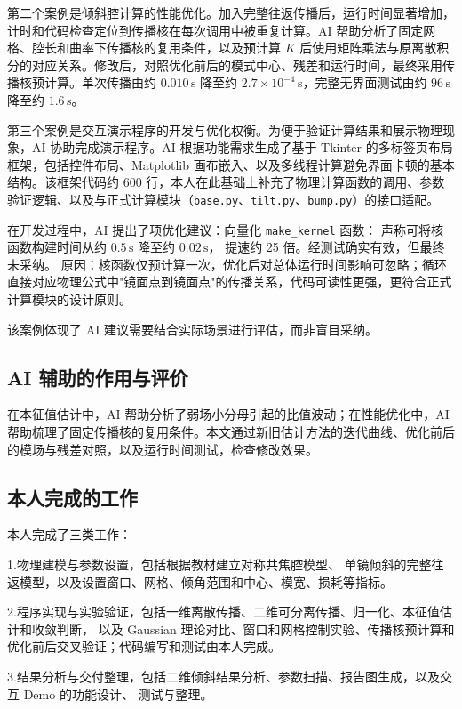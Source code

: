 \documentclass[UTF8,a4paper,12pt]{ctexart}
\begin{document}
第二个案例是倾斜腔计算的性能优化。加入完整往返传播后，运行时间显著增加，计时和代码检查定位到传播核在每次调用中被重复计算。AI 帮助分析了固定网格、腔长和曲率下传播核的复用条件，以及预计算 \(K\) 后使用矩阵乘法与原离散积分的对应关系。修改后，对照优化前后的模式中心、残差和运行时间，最终采用传播核预计算。单次传播由约 \(0.010\,\mathrm{s}\) 降至约 \(2.7\times10^{-4}\,\mathrm{s}\)，完整无界面测试由约 \(96\,\mathrm{s}\) 降至约 \(1.6\,\mathrm{s}\)。

第三个案例是交互演示程序的开发与优化权衡。为便于验证计算结果和展示物理现象，AI 协助完成演示程序。AI 根据功能需求生成了基于 Tkinter 的多标签页布局框架，包括控件布局、Matplotlib 画布嵌入、以及多线程计算避免界面卡顿的基本结构。该框架代码约 600 行，本人在此基础上补充了物理计算函数的调用、参数验证逻辑、以及与正式计算模块（\texttt{base.py}、\texttt{tilt.py}、\texttt{bump.py}）的接口适配。

在开发过程中，AI 提出了项优化建议：向量化 \texttt{make\_kernel} 函数：
声称可将核函数构建时间从约 \(0.5\,\mathrm{s}\) 降至约 \(0.02\,\mathrm{s}\)，
提速约 25 倍。经测试确实有效，但最终未采纳。
原因：核函数仅预计算一次，优化后对总体运行时间影响可忽略；循环直接对应物理公式中"镜面点到镜面点"的传播关系，代码可读性更强，更符合正式计算模块的设计原则。

该案例体现了 AI 建议需要结合实际场景进行评估，而非盲目采纳。

\subsection*{AI 辅助的作用与评价}
在本征值估计中，AI 帮助分析了弱场小分母引起的比值波动；在性能优化中，AI 帮助梳理了固定传播核的复用条件。本文通过新旧估计方法的迭代曲线、优化前后的模场与残差对照，以及运行时间测试，检查修改效果。

\subsection*{本人完成的工作}
本人完成了三类工作：

1.物理建模与参数设置，包括根据教材建立对称共焦腔模型、
单镜倾斜的完整往返模型，以及设置窗口、网格、倾角范围和中心、模宽、损耗等指标。

2.程序实现与实验验证，包括一维离散传播、二维可分离传播、归一化、本征值估计和收敛判断，
以及 Gaussian 理论对比、窗口和网格控制实验、传播核预计算和优化前后交叉验证；代码编写和测试由本人完成。

3.结果分析与交付整理，包括二维倾斜结果分析、参数扫描、报告图生成，以及交互 Demo 的功能设计、
测试与整理。
\end{document}
